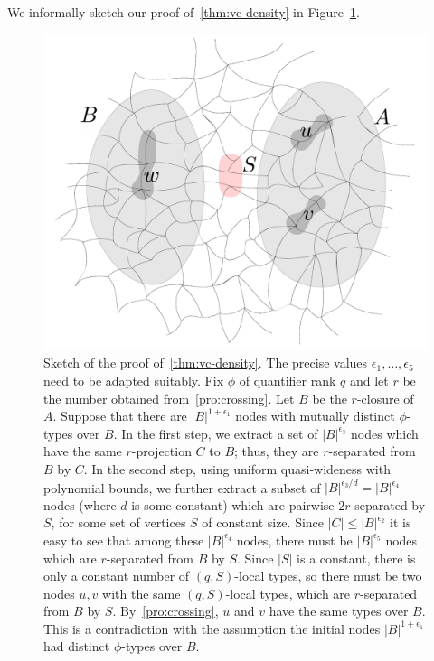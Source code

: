We informally sketch our proof of~\cref{thm:vc-density} in Figure~\ref{fig:sketch}.
\begin{figure}[h!]
	\centering
		\includegraphics[scale=0.35,page=4]{pics}
	\caption{Sketch of the proof of~\cref{thm:vc-density}. The precise values $\epsilon_1,\ldots,\epsilon_5$ need to be adapted suitably.
	Fix $\phi$ of quantifier rank $q$ and let 
$r$ be the number obtained from~\cref{pro:crossing}.
Let $B$ be the $r$-closure of $A$. 
	Suppose that there are $|B|^{1+\epsilon_1}$ nodes with
	mutually distinct $\phi$-types over $B$.
	In the first step, we extract a set of $|B|^{\epsilon_3}$
	nodes which have the same $r$-projection $C$ to $B$;
	thus, they are $r$-separated from $B$ by $C$.
In the second step, using uniform quasi-wideness
with polynomial bounds,
	we further extract a subset of $|B|^{\epsilon_3/d}=|B|^{\epsilon_4}$ nodes
	(where $d$ is some constant)
	 which 
	are pairwise $2r$-separated by $S$, for some set of vertices $S$
	of constant size.
Since $|C|\le|B|^{\epsilon_2}$ 
it is easy to see that among these
	$|B|^{\epsilon_4}$ nodes,
there must be $|B|^{\epsilon_5}$
nodes which are $r$-separated from $B$ by $S$.
	Since $|S|$ is a constant,
	there is only a constant number of $(q,S)$-local types,
	so there must be two nodes $u,v$
	with the same $(q,S)$-local types, 
	which are $r$-separated from $B$ by $S$.
	By~\cref{pro:crossing}, $u$ and $v$ have the same types over $B$. This is a contradiction with the assumption the initial nodes $|B|^{1+\epsilon_1}$ had distinct $\phi$-types over $B$.	
	}
	\label{fig:sketch}
\end{figure}
